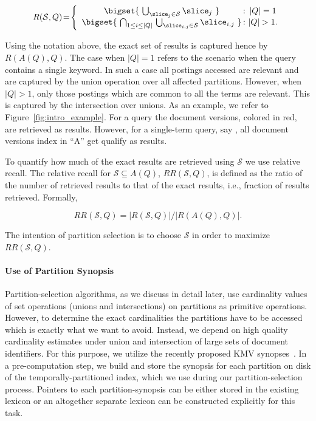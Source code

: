 \begin{equation}
R(\mathcal{S},Q) \!=\!
\left\{\begin{array}{c@{\,:\,\,}c}
 \bigset{ \,\,\bigcup_{\slice_j \in \mathcal{S}}{\slice_{j}} \,\,}& |Q| = 1\\
 \bigset{ \,\,\bigcap_{1 \leq i \leq |Q|}\,\bigcup_{\slice_{i,j} \in \mathcal{S}}{\slice_{i,j}} \,\,} & |Q| > 1.
 \end{array}\right.
\end{equation}

Using the notation above, the exact set of results is captured hence by $R(A(Q), Q)$. The case when $|Q| = 1$ refers to the scenario when the query contains a single keyword. In such a case all postings accessed are relevant and are captured by the union operation over all affected partitions. However, when $|Q| > 1$, only those postings which are common to all the terms are relevant. This is captured by the intersection over unions. As an example, we refer to Figure~\ref{fig:intro_example}. For a query  the document versions, colored in red, are retrieved as results. However, for a single-term query, say , all document versions index in ``A'' get qualify as results.

To quantify how much of the exact results are retrieved using $\mathcal{S}$ we use relative recall. The relative recall for $\mathcal{S} \subseteq A(Q)$, $RR(\mathcal{S},Q)$, is defined as the ratio of the number of retrieved results to that of the exact results, i.e., fraction of results retrieved. Formally, 

\begin{equation}
RR(\mathcal{S},Q) \!=\! |R(\mathcal{S},Q)| / |R(A(Q),Q)|.
\end{equation}

The intention of partition selection is to choose $\mathcal{S}$ in order to maximize $RR(\mathcal{S},Q)$.

\paragraph{Use of Partition Synopsis}
Partition-selection algorithms, as we discuss in detail later, use cardinality values of set operations (unions and intersections) on partitions as primitive operations. However, to determine the exact cardinalities the partitions have to be accessed which is exactly what we want to avoid. Instead, we depend on high quality cardinality estimates under union and intersection of large sets of document identifiers. For this purpose, we utilize the recently proposed KMV synopses~\cite{kmv:sigmod}. In a pre-computation step, we build and store the synopsis for each partition on disk of the temporally-partitioned index, which we use during our partition-selection process. Pointers to each partition-synopsis can be either stored in the existing lexicon or an altogether separate lexicon can be constructed explicitly for this task.

